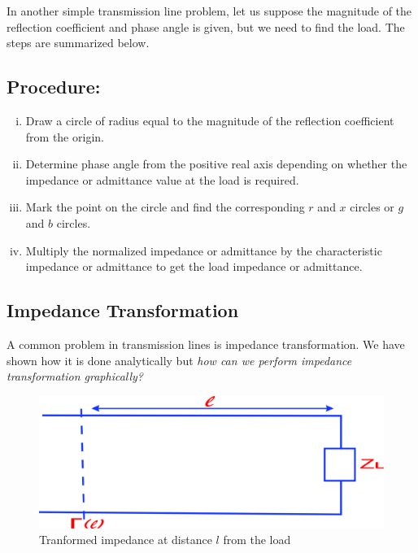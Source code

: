 In another simple transmission line problem, let us suppose the magnitude of the reflection coefficient and phase angle is given, but we need to find the load. The steps are summarized below.
\subsection*{Procedure:}
\begin{enumerate}[(i)]
\item Draw a circle of radius equal to the magnitude of the reflection coefficient from the origin.
\item Determine phase angle from the positive real axis depending on whether the impedance or admittance value at the load is required.
\item Mark the point on the circle and find the corresponding $r$ and $x$ circles or $g$ and $b$ circles.
\item Multiply the normalized impedance or admittance by the characteristic impedance or admittance to get the load impedance or admittance.
\end{enumerate}

\subsection{Impedance Transformation}
A common problem in transmission lines is impedance transformation. We have shown how it is done analytically but \emph{how can we perform impedance transformation graphically?} 
\begin{figure}[h]
\centering
\includegraphics[width=0.7\linewidth]{./graphics/wertuyuk}
\caption{Tranformed impedance at distance $l$ from the load}
\label{fig:wertuyuk}
\end{figure}

